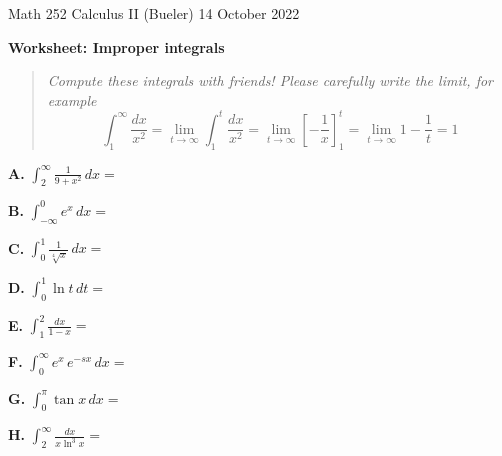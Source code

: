 \documentclass[11pt]{amsart}
\newcommand{\prob}[1]{\bigskip\noindent\textbf{#1.}\quad }
\newcommand{\ds}{\displaystyle}
\begin{document}
\scriptsize \noindent Math 252 Calculus II (Bueler) \hfill 14 October 2022 
\normalsize\medskip

\Large\centerline{\textbf{Worksheet: Improper integrals}}
\medskip
\normalsize

\thispagestyle{empty}
\begin{quote}
\emph{Compute these integrals with friends!  Please carefully write the limit, for example}
    $$\int_1^\infty \frac{dx}{x^2} = \lim_{t\to \infty} \int_1^t \frac{dx}{x^2} = \lim_{t\to \infty} \left[-\frac{1}{x}\right]_1^t = \lim_{t\to \infty} 1 - \frac{1}{t} = 1$$
\end{quote}
\bigskip

\prob{A}  $\ds \int_2^\infty \frac{1}{9+x^2}\,dx =$
\vfill

\prob{B}  $\ds \int_{-\infty}^0 e^x\,dx =$
\vfill

\prob{C}  $\ds \int_0^1 \frac{1}{\sqrt[4]{x}}\,dx =$
\vfill

\prob{D}  $\ds \int_0^1 \ln t\,dt =$
\vfill

\clearpage\newpage
\prob{E}  $\ds \int_1^2 \frac{dx}{1-x} =$
\vfill

\prob{F}  $\ds \int_0^\infty e^x \,e^{-s x}\,dx =$
\vfill

\prob{G}  $\ds \int_0^\pi \tan x\,dx =$
\vfill

\prob{H}  $\ds \int_2^\infty \frac{dx}{x \ln^3 x} =$
\vspace{3.0in}
\end{document}
